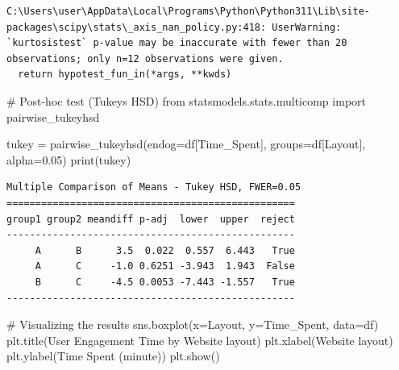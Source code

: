 \documentclass[
  letterpaper,
  DIV=11,
  numbers=noendperiod]{scrartcl}
\newenvironment{Shaded}{\begin{snugshade}}{\end{snugshade}}
\newcommand{\BuiltInTok}[1]{\textcolor[rgb]{0.00,0.23,0.31}{#1}}
\newcommand{\CommentTok}[1]{\textcolor[rgb]{0.37,0.37,0.37}{#1}}
\newcommand{\FloatTok}[1]{\textcolor[rgb]{0.68,0.00,0.00}{#1}}
\newcommand{\ImportTok}[1]{\textcolor[rgb]{0.00,0.46,0.62}{#1}}
\newcommand{\NormalTok}[1]{\textcolor[rgb]{0.00,0.23,0.31}{#1}}
\newcommand{\OperatorTok}[1]{\textcolor[rgb]{0.37,0.37,0.37}{#1}}
\newcommand{\StringTok}[1]{\textcolor[rgb]{0.13,0.47,0.30}{#1}}
\begin{document}
\begin{verbatim}
C:\Users\user\AppData\Local\Programs\Python\Python311\Lib\site-packages\scipy\stats\_axis_nan_policy.py:418: UserWarning: `kurtosistest` p-value may be inaccurate with fewer than 20 observations; only n=12 observations were given.
  return hypotest_fun_in(*args, **kwds)
\end{verbatim}

\begin{Shaded}
\begin{Highlighting}[]
\CommentTok{\# Post{-}hoc test (Tukey\textquotesingle{}s HSD)}
\ImportTok{from}\NormalTok{ statsmodels.stats.multicomp }\ImportTok{import}\NormalTok{ pairwise\_tukeyhsd}

\NormalTok{tukey }\OperatorTok{=}\NormalTok{ pairwise\_tukeyhsd(endog}\OperatorTok{=}\NormalTok{df[}\StringTok{\textquotesingle{}Time\_Spent\textquotesingle{}}\NormalTok{], groups}\OperatorTok{=}\NormalTok{df[}\StringTok{\textquotesingle{}Layout\textquotesingle{}}\NormalTok{], alpha}\OperatorTok{=}\FloatTok{0.05}\NormalTok{)}
\BuiltInTok{print}\NormalTok{(tukey)}
\end{Highlighting}
\end{Shaded}

\begin{verbatim}
Multiple Comparison of Means - Tukey HSD, FWER=0.05
==================================================
group1 group2 meandiff p-adj  lower  upper  reject
--------------------------------------------------
     A      B      3.5  0.022  0.557  6.443   True
     A      C     -1.0 0.6251 -3.943  1.943  False
     B      C     -4.5 0.0053 -7.443 -1.557   True
--------------------------------------------------
\end{verbatim}

\begin{Shaded}
\begin{Highlighting}[]
\CommentTok{\# Visualizing the results}
\NormalTok{sns.boxplot(x}\OperatorTok{=}\StringTok{\textquotesingle{}Layout\textquotesingle{}}\NormalTok{, y}\OperatorTok{=}\StringTok{\textquotesingle{}Time\_Spent\textquotesingle{}}\NormalTok{, data}\OperatorTok{=}\NormalTok{df)}
\NormalTok{plt.title(}\StringTok{\textquotesingle{}User Engagement Time by Website layout\textquotesingle{}}\NormalTok{)}
\NormalTok{plt.xlabel(}\StringTok{\textquotesingle{}Website layout\textquotesingle{}}\NormalTok{)}
\NormalTok{plt.ylabel(}\StringTok{\textquotesingle{}Time Spent (minute)\textquotesingle{}}\NormalTok{)}
\NormalTok{plt.show()}
\end{Highlighting}
\end{Shaded}
\end{document}
